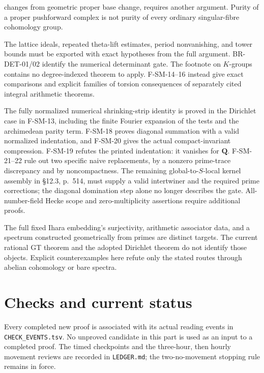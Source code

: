 \begin{description}[style=nextline,leftmargin=0pt]
changes from geometric proper base change, requires another argument.
Purity of a proper pushforward
complex is not purity of every ordinary singular-fibre cohomology group.
\item[The analytic method as a transferable theorem.]
The lattice ideals, repeated theta-lift estimates, period nonvanishing,
and tower bounds must be exported with exact hypotheses from the
full argument. BR-DET-01/02 identify the numerical determinant gate.
The footnote on $K$-groups contains no degree-indexed theorem to apply.
F-SM-14--16 instead give exact comparisons and explicit families of
torsion consequences of separately cited integral arithmetic theorems.
\item[Masullo's operator realization.]
The fully normalized numerical shrinking-strip identity is proved in
the Dirichlet case in F-SM-13, including the finite Fourier expansion
of the tests and the archimedean parity term. F-SM-18 proves diagonal summation with a valid normalized indentation,
and F-SM-20 gives the actual compact-invariant compression. F-SM-19
refutes the printed indentation: it vanishes for $\mathbf Q$.
F-SM-21--22 rule out two specific naive replacements, by a nonzero
prime-trace discrepancy and by noncompactness. The remaining
global-to-$S$-local kernel assembly in \S12.3, p.~514, must supply
a valid intertwiner and the required prime corrections; the
diagonal domination step alone no longer describes the gate. All-number-field Hecke scope and
zero-multiplicity assertions require additional proofs.
\item[Profinite GT, anabelian reconstruction and geometric spectra.]
The full fixed Ihara embedding's surjectivity, arithmetic associator
data, and a spectrum constructed geometrically from primes are distinct
targets. The current rational GT theorem and the adopted Dirichlet
theorem do not identify those objects. Explicit counterexamples here
refute only the stated routes through abelian cohomology or bare spectra.
\end{description}

\section{Checks and current status}
Every completed new proof is associated with its actual reading events
in \texttt{CHECK\_EVENTS.tsv}. No unproved candidate in this part is
used as an input to a completed proof. The timed checkpoints and the
three-hour, then hourly movement reviews are recorded in
\texttt{LEDGER.md}; the two-no-movement stopping rule remains in force.
